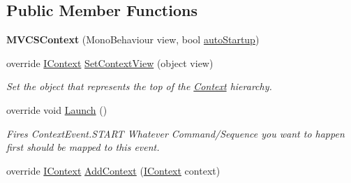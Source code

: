 \subsection*{Public Member Functions}
\begin{DoxyCompactItemize}
\item 
\hypertarget{classstrange_1_1extensions_1_1context_1_1impl_1_1_m_v_c_s_context_a5b6f18989a63526311d714ee84a96afc}{{\bfseries M\-V\-C\-S\-Context} (Mono\-Behaviour view, bool \hyperlink{classstrange_1_1extensions_1_1context_1_1impl_1_1_context_a3386ea2967ba720218b89eaefac77d56}{auto\-Startup})}\label{classstrange_1_1extensions_1_1context_1_1impl_1_1_m_v_c_s_context_a5b6f18989a63526311d714ee84a96afc}

\item 
override \hyperlink{interfacestrange_1_1extensions_1_1context_1_1api_1_1_i_context}{I\-Context} \hyperlink{classstrange_1_1extensions_1_1context_1_1impl_1_1_m_v_c_s_context_aecc258bb5f3d3edd1a3f93ca33a2ce4e}{Set\-Context\-View} (object view)
\begin{DoxyCompactList}\small\item\em Set the object that represents the top of the \hyperlink{classstrange_1_1extensions_1_1context_1_1impl_1_1_context}{Context} hierarchy. \end{DoxyCompactList}\item 
override void \hyperlink{classstrange_1_1extensions_1_1context_1_1impl_1_1_m_v_c_s_context_a70e1400cfb5a71447080acdf79ca93f9}{Launch} ()
\begin{DoxyCompactList}\small\item\em Fires Context\-Event.\-S\-T\-A\-R\-T Whatever Command/\-Sequence you want to happen first should be mapped to this event. \end{DoxyCompactList}\item 
\hypertarget{classstrange_1_1extensions_1_1context_1_1impl_1_1_m_v_c_s_context_a27f92d370b558c358804365136176957}{override \hyperlink{interfacestrange_1_1extensions_1_1context_1_1api_1_1_i_context}{I\-Context} \hyperlink{classstrange_1_1extensions_1_1context_1_1impl_1_1_m_v_c_s_context_a27f92d370b558c358804365136176957}{Add\-Context} (\hyperlink{interfacestrange_1_1extensions_1_1context_1_1api_1_1_i_context}{I\-Context} context)}\label{classstrange_1_1extensions_1_1context_1_1impl_1_1_m_v_c_s_context_a27f92d370b558c358804365136176957}


\end{DoxyCompactItemize}
